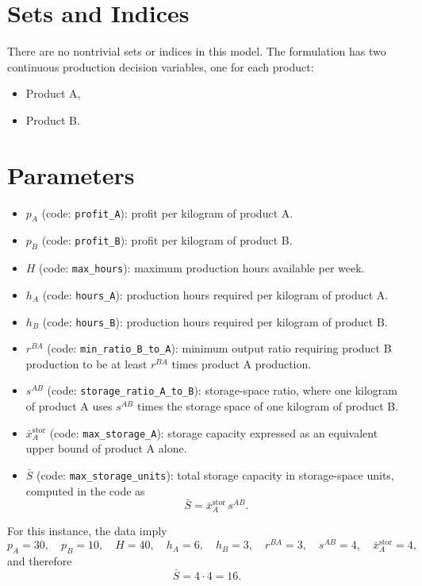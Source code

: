 \section*{Sets and Indices}

There are no nontrivial sets or indices in this model. The formulation has two continuous production decision variables, one for each product:
\begin{itemize}
    \item Product A,
    \item Product B.
\end{itemize}

\section*{Parameters}

\begin{itemize}
    \item $p_A$ (code: \texttt{profit\_A}): profit per kilogram of product A.
    \item $p_B$ (code: \texttt{profit\_B}): profit per kilogram of product B.
    \item $H$ (code: \texttt{max\_hours}): maximum production hours available per week.
    \item $h_A$ (code: \texttt{hours\_A}): production hours required per kilogram of product A.
    \item $h_B$ (code: \texttt{hours\_B}): production hours required per kilogram of product B.
    \item $r^{BA}$ (code: \texttt{min\_ratio\_B\_to\_A}): minimum output ratio requiring product B production to be at least $r^{BA}$ times product A production.
    \item $s^{AB}$ (code: \texttt{storage\_ratio\_A\_to\_B}): storage-space ratio, where one kilogram of product A uses $s^{AB}$ times the storage space of one kilogram of product B.
    \item $\bar{x}_A^{\text{stor}}$ (code: \texttt{max\_storage\_A}): storage capacity expressed as an equivalent upper bound of product A alone.
    \item $\bar{S}$ (code: \texttt{max\_storage\_units}): total storage capacity in storage-space units, computed in the code as
    \[
    \bar{S} = \bar{x}_A^{\text{stor}} \, s^{AB}.
    \]
\end{itemize}

For this instance, the data imply
\[
p_A=30,\quad p_B=10,\quad H=40,\quad h_A=6,\quad h_B=3,\quad r^{BA}=3,\quad s^{AB}=4,\quad \bar{x}_A^{\text{stor}}=4,
\]
and therefore
\[
\bar{S}=4\cdot 4=16.
\]

